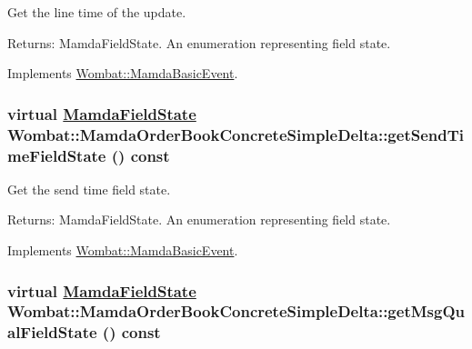 Get the line time of the update. 

\begin{Desc}
\item[Returns:]Mamda\-Field\-State. An enumeration representing field state. \end{Desc}


Implements \hyperlink{classWombat_1_1MamdaBasicEvent_eb06352aca3280c5e89bad7a3b185cdf}{Wombat::Mamda\-Basic\-Event}.\hypertarget{classWombat_1_1MamdaOrderBookConcreteSimpleDelta_d72939b490f7bc0b99b3c704fbbff641}{
\subsubsection[getSendTimeFieldState]{\setlength{\rightskip}{0pt plus 5cm}virtual \hyperlink{namespaceWombat_93aac974f2ab713554fd12a1fa3b7d2a}{Mamda\-Field\-State} Wombat::Mamda\-Order\-Book\-Concrete\-Simple\-Delta::get\-Send\-Time\-Field\-State () const}}
\label{classWombat_1_1MamdaOrderBookConcreteSimpleDelta_d72939b490f7bc0b99b3c704fbbff641}


Get the send time field state. 

\begin{Desc}
\item[Returns:]Mamda\-Field\-State. An enumeration representing field state. \end{Desc}


Implements \hyperlink{classWombat_1_1MamdaBasicEvent_418ecb29b412cd42581b54c87b5360fd}{Wombat::Mamda\-Basic\-Event}.\hypertarget{classWombat_1_1MamdaOrderBookConcreteSimpleDelta_9bdeef1eb97dfe5f2210fbd8b9eb0cdc}{
\subsubsection[getMsgQualFieldState]{\setlength{\rightskip}{0pt plus 5cm}virtual \hyperlink{namespaceWombat_93aac974f2ab713554fd12a1fa3b7d2a}{Mamda\-Field\-State} Wombat::Mamda\-Order\-Book\-Concrete\-Simple\-Delta::get\-Msg\-Qual\-Field\-State () const}}
\label{classWombat_1_1MamdaOrderBookConcreteSimpleDelta_9bdeef1eb97dfe5f2210fbd8b9eb0cdc}


